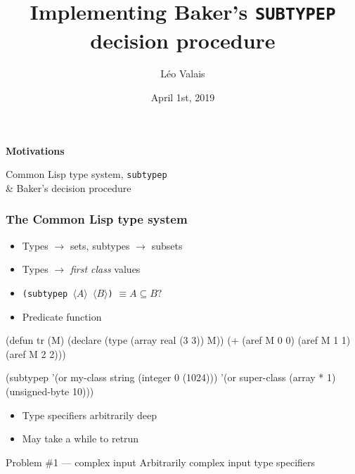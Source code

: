 \documentclass[aspectratio=169]{beamer}
\title{Implementing Baker's \texttt{SUBTYPEP} decision procedure\vspace*{-5mm}}
\date{April 1st, 2019}
\author{Léo Valais}
\institute{European Lisp Symposium}
\renewcommand\code[1]{\texttt{#1}}
\newcommand\rarr{\ensuremath{\rightarrow}}
\newcommand\plholder[1]{\ensuremath{\langle {#1} \rangle}}
\begin{document}
\begin{frame}
\titlepage{}
\end{frame}

\newenvironment{sectionframe}[1]{%
  \begin{frame}[standout]
    \centering
    \Huge
    {\bf #1}

    {\usebeamercolor[bg]{secondary color}\noindent\sout{\hfill}}
    \bigskip

    \large
  }{\end{frame}}

\begin{sectionframe}{Motivations}
  Common Lisp type system, \code{subtypep} \\\& Baker's decision procedure
\end{sectionframe}

\begin{frame}[fragile]
  \frametitle{The Common Lisp type system}
  \begin{itemize}
  \item Types \rarr{} sets, subtypes \rarr{} subsets
  \item<3-> Types \rarr{} \emph{first class} values
  \end{itemize}

  \begin{itemize}
  \item<4-> \code{(subtypep \plholder A \plholder B)} $\equiv A \subseteq B?$
  \item<4-> Predicate function
  \end{itemize}

  \pause
  \medskip

  \begin{overprint}
\begin{clcode}
(defun tr (M)
  (declare (type (array real (3 3)) M))
  (+ (aref M 0 0)
     (aref M 1 1)
     (aref M 2 2)))
\end{clcode}

\begin{clcode}
(subtypep '(or my-class string (integer 0 (1024)))
          '(or super-class
               (array * 1)
               (unsigned-byte 10)))
\end{clcode}
  \end{overprint}

  \begin{popup}{.75}
    \begin{macosbox}{}
      \begin{itemize}
      \item Type specifiers arbitrarily deep
      \item May take a while to retrun
      \end{itemize}

      \begin{alertblock}{Problem \#1 --- complex input}
        Arbitrarily complex input type specifiers
      \end{alertblock}
    \end{macosbox}
  \end{popup}
\end{frame}
\end{document}
